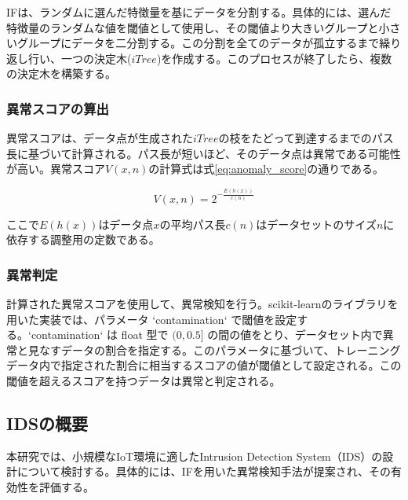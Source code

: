 \documentclass{css}
\begin{document}
IFは、ランダムに選んだ特徴量を基にデータを分割する。具体的には、選んだ特徴量のランダムな値を閾値として使用し、その閾値より大きいグループと小さいグループにデータを二分割する。この分割を全てのデータが孤立するまで繰り返し行い、一つの決定木($iTree$)を作成する。このプロセスが終了したら、複数の決定木を構築する。

\subsubsection{異常スコアの算出}

異常スコアは、データ点が生成された$iTree$の枝をたどって到達するまでのパス長に基づいて計算される。パス長が短いほど、そのデータ点は異常である可能性が高い。異常スコア$V(x,n)$の計算式は式\ref{eq:anomaly_score}の通りである。


\begin{equation}
    V(x, n) = 2^{-\frac{E(h(x))}{c(n)}}
    \label{eq:anomaly_score}
\end{equation}


ここで$E(h(x))$はデータ点$x$の平均パス長$c(n)$はデータセットのサイズ$n$に依存する調整用の定数である。

\subsubsection{異常判定}
計算された異常スコアを使用して、異常検知を行う。scikit-learnのライブラリを用いた実装では、パラメータ `contamination` で閾値を設定する。`contamination` は float 型で $(0, 0.5]$ の間の値をとり、データセット内で異常と見なすデータの割合を指定する。このパラメータに基づいて、トレーニングデータ内で指定された割合に相当するスコアの値が閾値として設定される。この閾値を超えるスコアを持つデータは異常と判定される。



\subsection{IDSの概要}
本研究では、小規模なIoT環境に適したIntrusion Detection System（IDS）の設計について検討する。具体的には、IFを用いた異常検知手法が提案され、その有効性を評価する。
\end{document}
